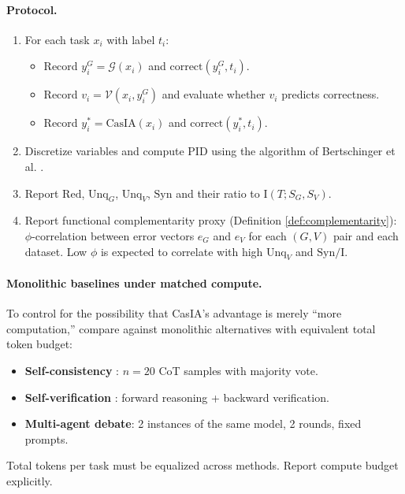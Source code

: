 \documentclass[11pt,a4paper]{article}
\theoremstyle{remark}
\newcommand{\Syn}{\mathrm{Syn}}
\newcommand{\Red}{\mathrm{Red}}
\newcommand{\Unq}{\mathrm{Unq}}
\newcommand{\MI}{\mathrm{I}}
\begin{document}
\paragraph{Protocol.}
\begin{enumerate}
  \item For each task $x_i$ with label $t_i$:
  \begin{itemize}
    \item Record $y_i^G = \mathcal{G}(x_i)$ and $\text{correct}(y_i^G, t_i)$.
    \item Record $v_i = \mathcal{V}(x_i, y_i^G)$ and evaluate whether $v_i$ predicts correctness.
    \item Record $y_i^* = \text{CasIA}(x_i)$ and $\text{correct}(y_i^*, t_i)$.
  \end{itemize}
  \item Discretize variables and compute PID using the algorithm of Bertschinger et al. \cite{bertschinger2014pid}.
  \item Report $\Red$, $\Unq_G$, $\Unq_V$, $\Syn$ and their ratio to $\MI(T; S_G, S_V)$.
  \item Report functional complementarity proxy (Definition \ref{def:complementarity}): $\phi$-correlation between error vectors $e_G$ and $e_V$ for each $(G, V)$ pair and each dataset. Low $\phi$ is expected to correlate with high $\Unq_V$ and $\Syn/\MI$.
\end{enumerate}

\paragraph{Monolithic baselines under matched compute.} To control for the possibility that CasIA's advantage is merely ``more computation,'' compare against monolithic alternatives with equivalent total token budget:
\begin{itemize}
  \item \textbf{Self-consistency} \cite{wang2023selfconsistency}: $n = 20$ CoT samples with majority vote.
  \item \textbf{Self-verification} \cite{weng2023verification}: forward reasoning + backward verification.
  \item \textbf{Multi-agent debate}: 2 instances of the same model, 2 rounds, fixed prompts.
\end{itemize}
Total tokens per task must be equalized across methods. Report compute budget explicitly.
\end{document}
